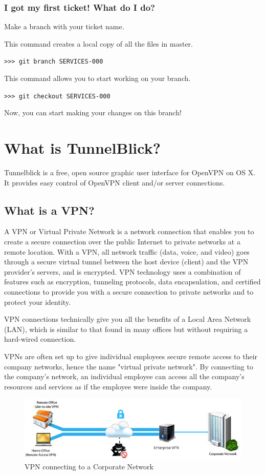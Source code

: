 \documentclass[oneside]{book}
\begin{document}
\subsection{I got my first ticket! What do I do?}
\noindent Make a branch with your ticket name.\par
This command creates a local copy of all the files in master.\par
\texttt{>>> git branch SERVICES-000} \par
\noindent This command allows you to start working on your branch.\par
\texttt{>>> git checkout SERVICES-000} \par
\noindent Now, you can start making your changes on this branch!
\chapter{What is TunnelBlick?}
Tunnelblick is a free, open source graphic user interface for OpenVPN on OS X. It provides easy control of OpenVPN client and/or server connections.
\section{What is a VPN?}
A VPN or Virtual Private Network is a network connection that enables you to create a secure connection over the public Internet to private networks at a remote location. With a VPN, all network traffic (data, voice, and video) goes through a secure virtual tunnel between the host device (client) and the VPN provider's servers, and is encrypted. VPN technology uses a combination of features such as encryption, tunneling protocols, data encapsulation, and certified connections to provide you with a secure connection to private networks and to protect your identity.\par
VPN connections technically give you all the benefits of a Local Area Network (LAN), which is similar to that found in many offices but without requiring a hard-wired connection.\par
VPNs are often set up to give individual employees secure remote access to their company networks, hence the name "virtual private network". By connecting to the company's network, an individual employee can access all the company's resources and services as if the employee were inside the company.
\begin{figure}[h!]
\centering
	\includegraphics[scale=0.3]{VPN.png}
	\caption{VPN connecting to a Corporate Network}
\end{figure}
\end{document}

